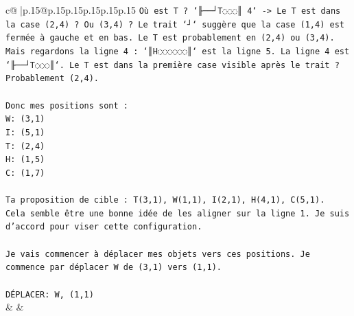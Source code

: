 \documentclass{article}
\begin{document}
{\begin{supertabular}{c@{$\;$}|p{.15\linewidth}@{}p{.15\linewidth}p{.15\linewidth}p{.15\linewidth}p{.15\linewidth}p{.15\linewidth}}
{{{\texttt{Où est T ? `╟──┘T◌◌◌║ 4` {-}> Le T est dans la case (2,4) ? Ou (3,4) ? Le trait `┘` suggère que la case (1,4) est fermée à gauche et en bas. Le T est probablement en (2,4) ou (3,4). Mais regardons la ligne 4 : `║H◌◌◌◌◌◌║` est la ligne 5. La ligne 4 est `╟──┘T◌◌◌║`. Le T est dans la première case visible après le trait ? Probablement (2,4).} \\
\\ 
\texttt{Donc mes positions sont :} \\
\texttt{W: (3,1)} \\
\texttt{I: (5,1)} \\
\texttt{T: (2,4)} \\
\texttt{H: (1,5)} \\
\texttt{C: (1,7)} \\
\\ 
\texttt{Ta proposition de cible : T(3,1), W(1,1), I(2,1), H(4,1), C(5,1).} \\
\texttt{Cela semble être une bonne idée de les aligner sur la ligne 1. Je suis d'accord pour viser cette configuration.} \\
\\ 
\texttt{Je vais commencer à déplacer mes objets vers ces positions. Je commence par déplacer W de (3,1) vers (1,1).} \\
\\ 
\texttt{DÉPLACER: W, (1,1)} \\
            }
        }
    }
    & & \\ \\


\end{supertabular}}
\end{document}

